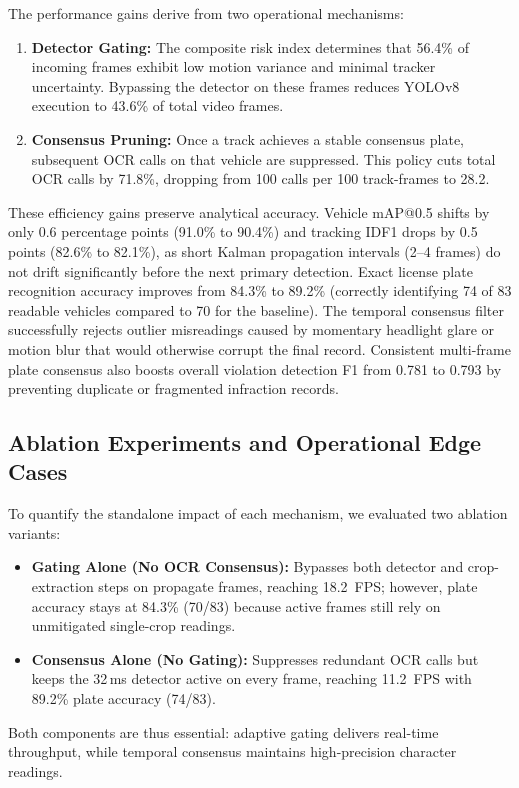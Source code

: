 The performance gains derive from two operational mechanisms:
\begin{enumerate}
  \item \textbf{Detector Gating:} The composite risk index determines that 56.4\% of incoming frames exhibit low motion variance and minimal tracker uncertainty. Bypassing the detector on these frames reduces YOLOv8 execution to 43.6\% of total video frames.
  \item \textbf{Consensus Pruning:} Once a track achieves a stable consensus plate, subsequent OCR calls on that vehicle are suppressed. This policy cuts total OCR calls by 71.8\%, dropping from 100 calls per 100 track-frames to 28.2.
\end{enumerate}
These efficiency gains preserve analytical accuracy. Vehicle mAP@0.5 shifts by only 0.6 percentage points (91.0\% to 90.4\%) and tracking IDF1 drops by 0.5 points (82.6\% to 82.1\%), as short Kalman propagation intervals (2--4 frames) do not drift significantly before the next primary detection. Exact license plate recognition accuracy improves from 84.3\% to 89.2\% (correctly identifying 74 of 83 readable vehicles compared to 70 for the baseline). The temporal consensus filter successfully rejects outlier misreadings caused by momentary headlight glare or motion blur that would otherwise corrupt the final record. Consistent multi-frame plate consensus also boosts overall violation detection F1 from 0.781 to 0.793 by preventing duplicate or fragmented infraction records.

\subsection{Ablation Experiments and Operational Edge Cases}
To quantify the standalone impact of each mechanism, we evaluated two ablation variants:
\begin{itemize}
  \item \textbf{Gating Alone (No OCR Consensus):} Bypasses both detector and crop-extraction steps on propagate frames, reaching 18.2~FPS; however, plate accuracy stays at 84.3\% (70/83) because active frames still rely on unmitigated single-crop readings.
  \item \textbf{Consensus Alone (No Gating):} Suppresses redundant OCR calls but keeps the 32\,ms detector active on every frame, reaching 11.2~FPS with 89.2\% plate accuracy (74/83).
\end{itemize}
Both components are thus essential: adaptive gating delivers real-time throughput, while temporal consensus maintains high-precision character readings.

